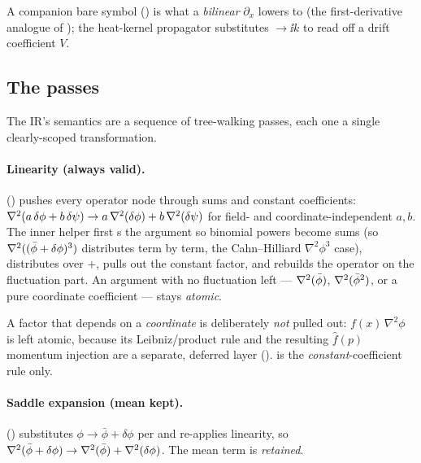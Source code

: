 A companion bare symbol 
() is what a \emph{bilinear} $\partial_{x}$
lowers to (the first-derivative analogue of ); the heat-kernel
propagator substitutes $\to \ii k$ to read off a drift coefficient
$V$.

\subsection{The passes}

The IR's semantics are a sequence of tree-walking passes, each one a single
clearly-scoped transformation.

\paragraph{Linearity (always valid).}
() pushes every operator node through sums and
constant coefficients: $\nabla^2(a\,\delta\phi+b\,\delta\psi)\to a\,\nabla^2(\delta\phi)+b\,\nabla^2(\delta\psi)$
for field- and coordinate-independent $a,b$. The inner helper 
first s the argument so binomial powers become sums (so
$\nabla^2((\bar\phi+\delta\phi)^{3})$ distributes term by term, the Cahn--Hilliard
$\nabla^{2}\phi^{3}$ case), distributes over $+$, pulls out the constant factor,
and rebuilds the operator on the fluctuation part. An argument with no
fluctuation left --- $\nabla^2(\bar\phi)$, $\nabla^2(\bar\phi^{2})$, or a pure coordinate
coefficient --- stays \emph{atomic}.

\begin{gotcha}
A factor that depends on a \emph{coordinate} is deliberately \emph{not} pulled
out: $f(x)\,\nabla^{2}\phi$ is left atomic, because its Leibniz/product rule and
the resulting $\hat f(p)$ momentum injection are a separate, deferred layer
().  is the
\emph{constant}-coefficient rule only.
\end{gotcha}

\paragraph{Saddle expansion (mean kept).}
() substitutes
$\phi\to\bar\phi+\delta\phi$ per 
and re-applies linearity, so $\nabla^2(\bar\phi+\delta\phi)\to\nabla^2(\bar\phi)+\nabla^2(\delta\phi)$.
The mean term is \emph{retained}.

